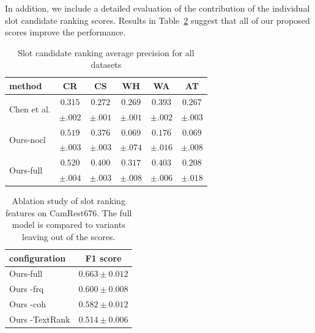 In addition, we include a detailed evaluation of the contribution of the individual slot candidate ranking scores.
Results in Table~\ref{table:ablation-ranking} suggest that all of our proposed scores improve the performance.
\begin{table}[h]
    \centering
    \small
    \begin{tabular}{lccccc}
    \hline
    \textbf{method} & \textbf{CR} & \textbf{CS} & \textbf{WH} & \textbf{WA} & \textbf{AT} \\
    \hline
    \multirow{2}{*}{Chen et al.} & $0.315$ & $0.272$ & $0.269$ & $0.393$ & $\pmb{0.267}$ \\
    & $\pm .002$ & $\pm .001$ & $ \pm .001$ & $ \pm .002$ & $ \pm .003$ \\ 
    \multirow{2}{*}{Ours-nocl} & $\pmb{0.519}$ & $0.376$ & $0.069$ & $0.176$ & $0.069$ \\
    & $\pm .003$ & $ \pm .003$ & $ \pm .074$ & $ \pm .016$ & $ \pm .008$ \\
    \multirow{2}{*}{Ours-full} & $\pmb{0.520}$ & $\pmb{0.400}$ & $\pmb{0.317}$ & $\pmb{0.403}$ & $0.208$ \\
    & $\pm .004$ & $\pm .003$ & $\pm .008$ & $ \pm .006$ & $ \pm .018$ \\

\hline
    \end{tabular}
    
    \caption{Slot candidate ranking average precision for all datasets}
    \label{table:avg-precision}
\end{table}
\begin{table}
    \centering
    \small
    \begin{tabular}{lc}
    \hline
     \textbf{configuration} & \bf F1 score\\
     \hline
     Ours-full & $\mathbf{0.663} \pm 0.012$ \\
     Ours -frq & $0.600 \pm 0.008$ \\
     Ours -coh & $0.582 \pm 0.012$ \\
     Ours -TextRank & $0.514 \pm 0.006$ \\

     \hline
    \end{tabular}
    \caption{Ablation study of slot ranking features on CamRest676. The full model is compared to variants leaving out of the scores.}
    \label{table:ablation-ranking}
\end{table}
